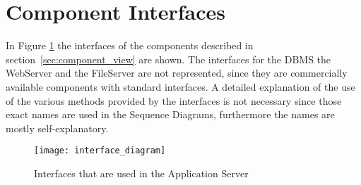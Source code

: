\section{Component Interfaces}
\label{sec:component_interfaces}
In Figure \ref{fig:interface_diagram} the interfaces of the components
described in section~\ref{sec:component_view} are shown.
The interfaces for the DBMS the WebServer and the FileServer are not
represented, since they are commercially available components with standard
interfaces.
A detailed explanation of the use of the various methods provided by the
interfaces is not necessary since those exact names are used in the Sequence
Diagrams, furthermore the names are mostly self-explanatory.

\begin{figure}[ht]
    \centering
    \texttt{[image: interface\_diagram]}
    \caption{Interfaces that are used in the Application Server}
    \label{fig:interface_diagram}
\end{figure}